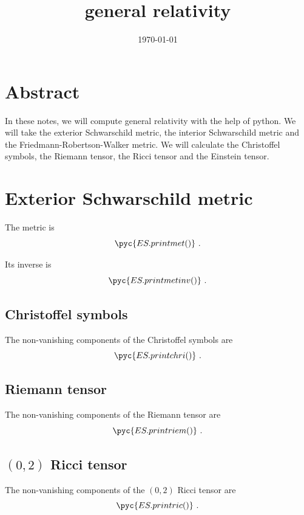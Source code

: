 \documentclass[a4paper, 12pt]{memoir}
\title{general relativity}
\date{\today}
\begin{document}
\frontmatter



\tableofcontents

\mainmatter



\chapter*{Abstract}

    In these notes, we will compute general relativity with the help of python. We will take the exterior Schwarschild metric, the interior Schwarschild metric and the Friedmann-Robertson-Walker metric. We will calculate the Christoffel symbols, the Riemann tensor, the Ricci tensor and the Einstein tensor.

\chapter{Exterior Schwarschild metric}

    The metric is 
    \begin{equation*}
        \pyc{ES.printmet()} ~.
    \end{equation*}

    Its inverse is 
    \begin{equation*}
        \pyc{ES.printmetinv()} ~.
    \end{equation*}

\section{Christoffel symbols}
    The non-vanishing components of the Christoffel symbols are
    \begin{equation*}
        \pyc{ES.printchri()} ~.
    \end{equation*}

\section{Riemann tensor}
    The non-vanishing components of the Riemann tensor are
    \begin{equation*}
        \pyc{ES.printriem()} ~.
    \end{equation*}

\section{$(0,2)$ Ricci tensor}
    The non-vanishing components of the $(0,2)$ Ricci tensor are
    \begin{equation*}
        \pyc{ES.printric()} ~.
    \end{equation*}
\end{document}
